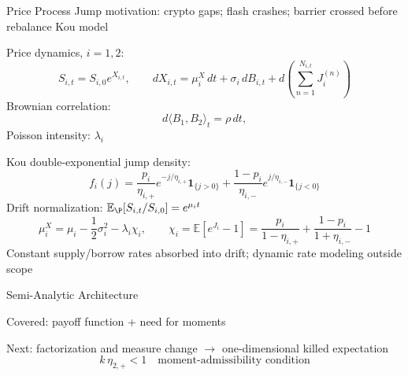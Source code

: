 \documentclass[aspectratio=169,10pt]{beamer}
\newcommand{\E}{\mathbb{E}}
\newcommand{\Pbb}{\mathbb{P}}
\newcommand{\one}{\mathbf{1}}
\begin{document}
\begin{frame}{Price Process}
  \small
  Jump motivation: crypto gaps; flash crashes; barrier crossed before rebalance
  \hfill Kou model~\cite{Kou2002}
  \vspace{0.25em}

  Price dynamics, $i=1,2$:
  \[
    S_{i,t}=S_{i,0}e^{X_{i,t}},
    \qquad
    dX_{i,t}
    =
    \mu_i^X\,dt+\sigma_i\,dB_{i,t}
    +d\!\left(\sum_{n=1}^{N_{i,t}}J_i^{(n)}\right)
  \]
  Brownian correlation:
  \[
    d\langle B_1,B_2\rangle_t=\rho\,dt,
  \]
  Poisson intensity: $\lambda_i$
  \vspace{0.2em}

  Kou double-exponential jump density:
  \[
    f_i(j)
    =
    \frac{p_i}{\eta_{i,+}}e^{-j/\eta_{i,+}}\one_{\{j>0\}}
    +
    \frac{1-p_i}{\eta_{i,-}}e^{j/\eta_{i,-}}\one_{\{j<0\}}
  \]
  Drift normalization: $\E_\P[S_{i,t}/S_{i,0}]=e^{\mu_i t}$
  \[
    \mu_i^X=\mu_i-\frac12\sigma_i^2-\lambda_i\chi_i,
    \qquad
    \chi_i=\E[e^{J_i}-1]
    =
    \frac{p_i}{1-\eta_{i,+}}+\frac{1-p_i}{1+\eta_{i,-}}-1
  \]
  Constant supply/borrow rates absorbed into drift; dynamic rate modeling outside scope
\end{frame}

\begin{frame}{Semi-Analytic Architecture}
  \small
  \begin{center}
  \end{center}
  \vspace{0.45em}
  Covered: payoff function + need for moments
  \vspace{0.25em}

  Next: factorization and measure change $\rightarrow$ one-dimensional killed expectation
  \[
    k\,\eta_{2,+}<1
    \quad\text{moment-admissibility condition}
  \]
\end{frame}
\end{document}
